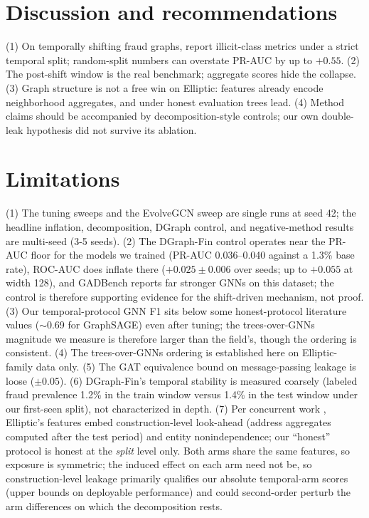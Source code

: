 \documentclass[11pt]{article}
\begin{document}
\section{Discussion and recommendations}
(1) On temporally shifting fraud graphs, report illicit-class metrics under a
strict temporal split; random-split numbers can overstate PR-AUC by up to
$+0.55$. (2) The post-shift window is the real benchmark; aggregate scores hide
the collapse. (3) Graph structure is not a free win on Elliptic: features already
encode neighborhood aggregates, and under honest evaluation trees lead. (4)
Method claims should be accompanied by decomposition-style controls; our own
double-leak hypothesis did not survive its ablation.

\section{Limitations}
\label{sec:limitations}
(1) The tuning sweeps and the EvolveGCN sweep are single runs at seed 42; the
headline inflation, decomposition, DGraph control, and negative-method results are
multi-seed (3-5 seeds). (2) The DGraph-Fin control operates near the
PR-AUC floor for the models we trained (PR-AUC 0.036--0.040 against a 1.3\% base
rate), ROC-AUC does inflate there ($+0.025\pm0.006$ over seeds; up to $+0.055$ at width 128), and GADBench reports far
stronger GNNs on this dataset; the control is therefore supporting evidence for
the shift-driven mechanism, not proof. (3) Our temporal-protocol GNN F1 sits below
some honest-protocol literature values ($\sim$0.69 for GraphSAGE) even after
tuning; the trees-over-GNNs magnitude we measure is therefore larger than the
field's, though the ordering is consistent. (4) The trees-over-GNNs ordering is
established here on Elliptic-family data only. (5) The GAT equivalence bound on
message-passing leakage is loose ($\pm 0.05$). (6) DGraph-Fin's temporal
stability is measured coarsely (labeled fraud prevalence 1.2\% in the train
window versus 1.4\% in the test window under our first-seen split), not
characterized in depth. (7) Per concurrent work \citep{safar2026opacity},
Elliptic's features embed construction-level look-ahead (address aggregates
computed after the test period) and entity nonindependence; our ``honest''
protocol is honest at the \emph{split} level only. Both arms share the same features, so exposure is
symmetric; the induced effect on each arm need not be, so construction-level
leakage primarily qualifies our absolute temporal-arm scores (upper bounds on
deployable performance) and could second-order perturb the arm differences on
which the decomposition rests.
\end{document}

